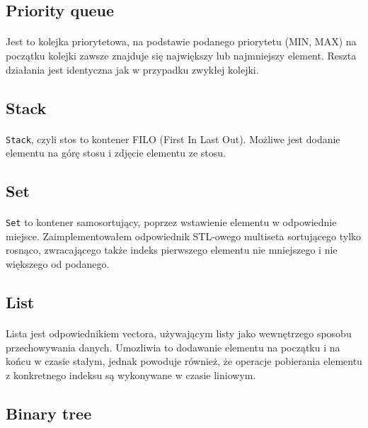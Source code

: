\documentclass{article}
\begin{document}
\subsection{Priority queue}
\paragraph{}
Jest to kolejka priorytetowa, na podstawie podanego priorytetu (MIN, MAX) na początku kolejki zawsze znajduje się
największy lub najmniejszy element. Reszta działania jest identyczna jak w przypadku zwykłej kolejki.

\subsection{Stack}
\paragraph{}
\texttt{Stack}, czyli stos to kontener FILO (First In Last Out). Możliwe jest dodanie elementu na górę stosu
i zdjęcie elementu ze stosu.

\subsection{Set}
\paragraph{}
\texttt{Set} to kontener samosortujący, poprzez wstawienie elementu w odpowiednie miejsce. Zaimplementowałem
odpowiednik STL-owego multiseta sortującego tylko rosnąco, zwracającego także indeks pierwszego elementu nie mniejszego i nie większego od podanego.

\subsection{List}
\paragraph{}
Lista jest odpowiednikiem vectora, używającym listy jako wewnętrzego sposobu przechowywania danych. Umozliwia to
dodawanie elementu na początku i na końcu w czasie stałym, jednak powoduje również, że operacje pobierania elementu z
konkretnego indeksu są wykonywane w czasie liniowym.

\subsection{Binary tree}
\end{document}
